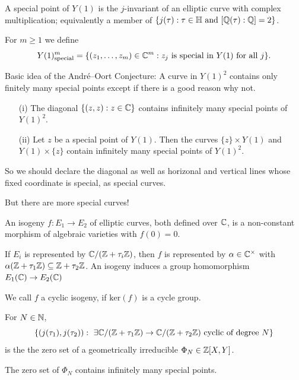 \documentclass{beamer}
\begin{document}
\begin{frame}
  \begin{definition}    
    A \alert{special point} of $Y(1)$ is the $j$-invariant of an elliptic curve
    with complex multiplication; equivalently a member of 
    $\{j(\tau) : \tau\in{\mathbb{H}} \text{ and }[{\mathbb{Q}}(\tau):{\mathbb{Q}}]=2\}$.

    For $m\ge 1$ we define
    $$
    Y(1)^m_{\mathrm{special}} = \{(z_1,\ldots,z_m)\in{\mathbb{C}}^m : z_j \text{ is
      special in $Y(1)$ for all $j$}\}.
    $$
  \end{definition}
\end{frame}

\begin{frame}
  Basic idea of the Andr\'e--Oort Conjecture: A curve in $Y(1)^2$
  contains only finitely many special points except if there is a good
  reason why not. 

  \begin{example}
    \begin{enumerate}
    \item[(i)] The diagonal  $\{(z,z) : z\in{\mathbb{C}}\}$ contains infinitely
      many special points of $Y(1)^2$. 
    \item [(ii)]  Let $z$ be a special point of $Y(1)$.  Then the curves
      $\{z\}\times Y(1)$ and $Y(1)\times \{z\}$ contain infinitely many
      special points of $Y(1)^2$. 
    \end{enumerate}
  \end{example}

  So we should declare the diagonal as well as horizonal and vertical
  lines whose fixed coordinate is  special, as special curves.

  But there are more special curves!
\end{frame}

\begin{frame}
  \begin{definition}
    An \alert{isogeny} $f\colon E_1\rightarrow E_2$ of elliptic curves, both
    defined over ${\mathbb{C}}$, is a non-constant morphism
    of algebraic varieties with $f(0)=0$. 
  \end{definition}
  
  If $E_i$ is represented by ${\mathbb{C}}/({\mathbb{Z}}+\tau_i{\mathbb{Z}})$,
  then $f$ is represented by $\alpha\in{\mathbb{C}}^\times$ with 
   $\alpha({\mathbb{Z}}+\tau_1{\mathbb{Z}})\subseteq {\mathbb{Z}}+\tau_2{\mathbb{Z}}$. An isogeny induces a \alert{group
   homomorphism} $E_1({\mathbb{C}})\rightarrow E_2({\mathbb{C}})$

  We call $f$ a \alert{cyclic isogeny}, if $\mathrm{ker}(f)$ is a cycle
  group.

  \begin{lemma}
    For $N\in{\mathbb{N}}$, 
    \begin{equation*}
      \left\{ (j(\tau_1),j(\tau_2)) : \text{ 
          $\exists {\mathbb{C}}/({\mathbb{Z}}+\tau_1{\mathbb{Z}})\rightarrow {\mathbb{C}}/({\mathbb{Z}}+\tau_2{\mathbb{Z}})$ cyclic of degree $N$}\right\}
    \end{equation*}
    is the
    the zero set of a geometrically irreducible $\Phi_N\in{\mathbb{Z}}[X,Y]$.
  \end{lemma}

  The zero set of $\Phi_N$ contains infinitely many special points. 
\end{frame}
\end{document}
